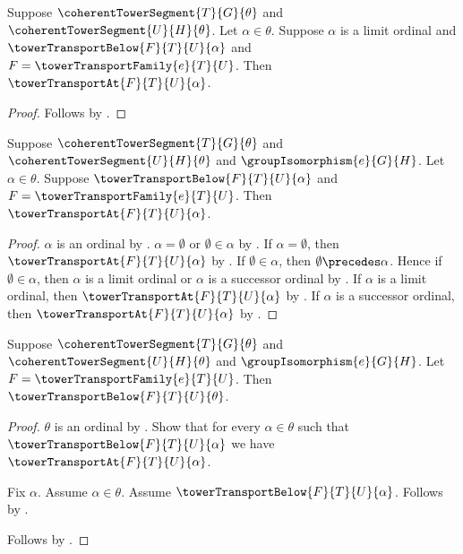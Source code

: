 \begin{proposition}\label{coherent_tower_transport_limit_case}
    Suppose $\coherentTowerSegment{T}{G}{\theta}$ and
        $\coherentTowerSegment{U}{H}{\theta}$.
    Let $\alpha\in\theta$.
    Suppose $\alpha$ is a limit ordinal and
        $\towerTransportBelow{F}{T}{U}{\alpha}$ and
        $F=\towerTransportFamily{e}{T}{U}$.
    Then $\towerTransportAt{F}{T}{U}{\alpha}$.
\end{proposition}
\begin{proof}
    Follows by .
\end{proof}

\begin{proposition}\label{coherent_tower_transport_step}
    Suppose $\coherentTowerSegment{T}{G}{\theta}$ and
        $\coherentTowerSegment{U}{H}{\theta}$ and
        $\groupIsomorphism{e}{G}{H}$.
    Let $\alpha\in\theta$.
    Suppose $\towerTransportBelow{F}{T}{U}{\alpha}$ and
        $F=\towerTransportFamily{e}{T}{U}$.
    Then $\towerTransportAt{F}{T}{U}{\alpha}$.
\end{proposition}
\begin{proof}
    $\alpha$ is an ordinal by
        .
    $\alpha=\emptyset$ or $\emptyset\in\alpha$ by
        .
    If $\alpha=\emptyset$, then
        $\towerTransportAt{F}{T}{U}{\alpha}$ by
        .
    If $\emptyset\in\alpha$, then $\emptyset\precedes\alpha$.
    Hence if $\emptyset\in\alpha$, then
        $\alpha$ is a limit ordinal or
        $\alpha$ is a successor ordinal by
        .
    If $\alpha$ is a limit ordinal, then
        $\towerTransportAt{F}{T}{U}{\alpha}$ by
        .
    If $\alpha$ is a successor ordinal, then
        $\towerTransportAt{F}{T}{U}{\alpha}$ by
        .
\end{proof}

\begin{theorem}\label{coherent_tower_transport_below}
    Suppose $\coherentTowerSegment{T}{G}{\theta}$ and
        $\coherentTowerSegment{U}{H}{\theta}$ and
        $\groupIsomorphism{e}{G}{H}$.
    Let $F=\towerTransportFamily{e}{T}{U}$.
    Then $\towerTransportBelow{F}{T}{U}{\theta}$.
\end{theorem}
\begin{proof}
    $\theta$ is an ordinal by
        .
    Show that for every $\alpha\in\theta$ such that
        $\towerTransportBelow{F}{T}{U}{\alpha}$ we have
        $\towerTransportAt{F}{T}{U}{\alpha}$.
    \begin{subproof}
        Fix $\alpha$.
        Assume $\alpha\in\theta$.
        Assume $\towerTransportBelow{F}{T}{U}{\alpha}$.
        Follows by .
    \end{subproof}
    Follows by .
\end{proof}

